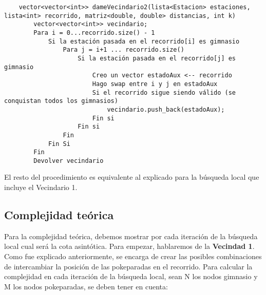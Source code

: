     \begin{codesnippet}
    \begin{verbatim}
    vector<vector<int>> dameVecindario2(lista<Estacion> estaciones, lista<int> recorrido, matriz<double, double> distancias, int k)
        vector<vector<int>> vecindario;
        Para i = 0...recorrido.size() - 1
            Si la estación pasada en el recorrido[i] es gimnasio
                Para j = i+1 ... recorrido.size()
                    Si la estación pasada en el recorrido[j] es gimnasio
                        Creo un vector estadoAux <-- recorrido
                        Hago swap entre i y j en estadoAux
                        Si el recorrido sigue siendo válido (se conquistan todos los gimnasios)
                            vecindario.push_back(estadoAux);
                        Fin si
                    Fin si
                Fin
            Fin Si
        Fin
        Devolver vecindario
    \end{verbatim}
    \end{codesnippet}
    
    \par El resto del procedimiento es equivalente al explicado para la búsqueda local que incluye el Vecindario 1.
   
    \subsection{Complejidad teórica}
        Para la complejidad teórica, debemos mostrar por cada iteración de la búsqueda local cual será la cota asintótica. Para empezar, hablaremos de la \textbf{Vecindad 1}. Como fue explicado anteriormente, se encarga de crear las posibles combinaciones de intercambiar la posición de las pokeparadas en el recorrido. Para calcular la complejidad en cada iteración de la búsqueda local, sean N los nodos gimnasio y M los nodos pokeparadas, se deben tener en cuenta:

